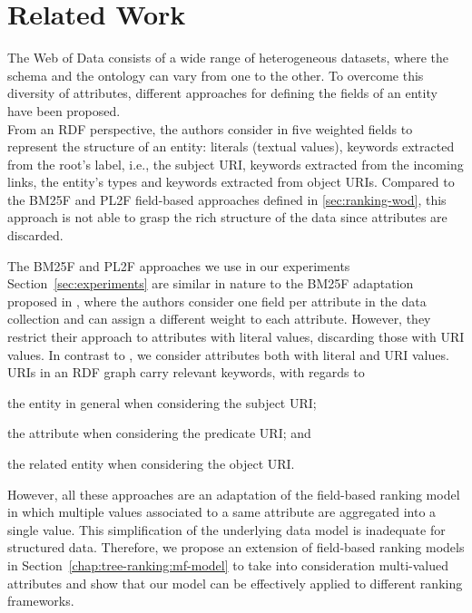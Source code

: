 \section{Related Work}
\label{sec:searching:relwork}

The Web of Data consists of a wide range of heterogeneous datasets, where the schema and the ontology can vary from one to the other. To overcome this diversity of attributes, different approaches for defining the \glspl{field} of an entity have been proposed.\\

From an RDF perspective, the authors consider in \cite{Perez-Aguera:2010:UBS} five weighted fields to represent the structure of an entity: literals (textual values), keywords extracted from the root's label, i.e., the subject URI, keywords extracted from the incoming links, the entity's \gls{types} and keywords extracted from object URIs. Compared to the BM25F and PL2F field-based approaches defined in \ref{sec:ranking-wod}, this approach is not able to grasp the rich structure of the data since attributes are discarded.

The BM25F and PL2F approaches we use in our experiments Section~\ref{sec:experiments} are similar in nature to the BM25F adaptation proposed in \cite{blanco:2011:iswc}, where the authors consider one field per attribute in the data collection and can assign a different weight to each attribute. However, they restrict their approach to attributes with literal values, discarding those with URI values. In contrast to \cite{blanco:2011:iswc}, we consider attributes both with literal and URI values. URIs in an RDF graph carry relevant keywords, with regards to
\begin{inparaenum}[(1)]
	\item the entity in general when considering the subject URI;
	\item the attribute when considering the predicate URI; and
	\item the related entity when considering the object URI.\\
\end{inparaenum}

However, all these approaches are an adaptation of the field-based ranking model in which multiple values associated to a same attribute are aggregated into a single value. This simplification of the underlying data model is inadequate for structured data. Therefore, we propose an extension of field-based ranking models in Section~\ref{chap:tree-ranking:mf-model} to take into consideration multi-valued attributes and show that our model can be effectively applied to different ranking frameworks.

